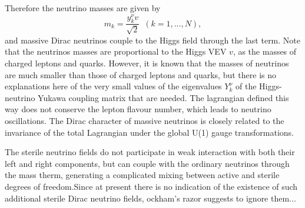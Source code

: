 Therefore the neutrino masses are given by
\begin{equation}
m_k=\frac{y_k^\nu v}{\sqrt{2}}\,\,\,\left(k=1,...,N\right),
\end{equation}
and massive Dirac neutrinos couple to the Higgs field through the last term. Note that the neutrinos masses are proportional to the Higgs VEV $v$, as the masses of charged leptons and quarks. However, it is known that the masses of neutrinos are much smaller than those of charged leptons and quarks, but there is no explanations here of the very small values of the eigenvalues $Y_k^{\nu}$ of the Higgs-neutrino Yukawa coupling matrix that are needed. The lagrangian defined this way does not conserve the lepton flavour number, which leads to neutrino oscillations. The Dirac character of massive neutrinos is closely related to the invariance of the total Lagrangian under the global U(1) gauge transformations.

The sterile neutrino fields do not participate in weak interaction with both their left and right components, but can couple with the ordinary neutrinos through the mass therm, generating a complicated mixing between active and sterile degrees of freedom.Since at present there is no indication of the existence of such additional sterile Dirac neutrino fields, ockham's razor suggests to ignore them...



